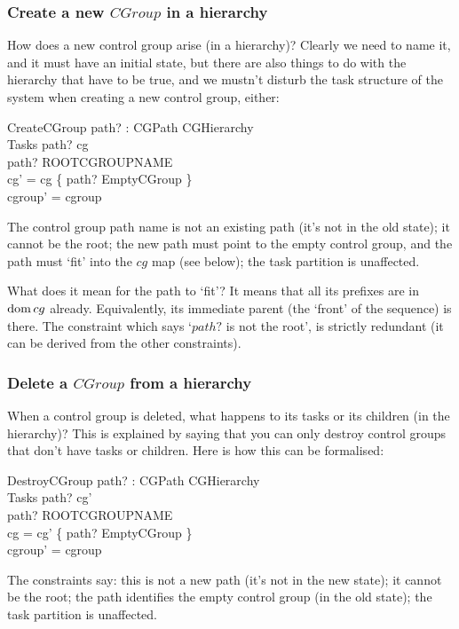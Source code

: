\documentclass[a4paper,twoside,12pt]{article}
\begin{document}
\subsubsection{Create a new $CGroup$ in a hierarchy}

How does a new control group arise (in a hierarchy)?
Clearly we need to name it, and it must have an initial state, but there are also things to do with the
hierarchy that have to be true, and we mustn't disturb the task structure of the system when
creating a new control group, either:

\begin{schema}{CreateCGroup}
path? : CGPath
\also
\Delta CGHierarchy \\
\Xi Tasks
\where
path? \notin \dom cg \\
path? \neq ROOTCGROUPNAME \\
cg' = cg \cup \{ path? \mapsto EmptyCGroup \} \\
cgroup' = cgroup
\end{schema}
The control group path name is not an existing path (it's not in the old state); it cannot be the root; 
the new path must point to the empty control group, and the path must `fit' into the $cg$ map (see below); the task partition is unaffected.

What does it mean for the path to `fit'? It means that all its prefixes are in $\mathop{\mathrm{dom}} cg$ already. Equivalently, its immediate parent (the `front' of the sequence) is there.
The constraint which says `$path?$ is not the root', is strictly redundant (it can be derived from the other constraints).

\subsubsection{Delete a $CGroup$ from a hierarchy}

When a control group is deleted, what happens to its tasks or its children (in the hierarchy)?
This is explained by saying that you can only destroy control groups that don't have tasks or children.
Here is how this can be formalised:

\begin{schema}{DestroyCGroup}
path? : CGPath
\also
\Delta CGHierarchy \\
\Xi Tasks
\where
path? \notin \dom cg' \\
path? \neq ROOTCGROUPNAME \\
cg = cg' \cup \{ path? \mapsto EmptyCGroup \} \\
cgroup' = cgroup
\end{schema}
The constraints say: this is not a new path (it's not in the new state); it cannot be the root;
the path identifies the empty control group (in the old state); the task partition is unaffected.
\end{document}
